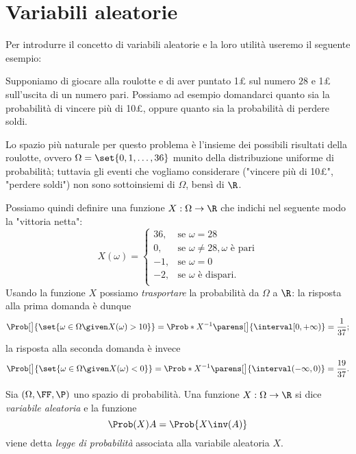 \section{Variabili aleatorie}

Per introdurre il concetto di variabili aleatorie e la loro utilità useremo il seguente esempio:
\begin{example}
    Supponiamo di giocare alla roulotte e di aver puntato 1£ sul numero $28$ e 1£ sull'uscita di un numero pari. Possiamo ad esempio domandarci quanto sia la probabilità di vincere più di 10£, oppure quanto sia la probabilità di perdere soldi.

    Lo spazio più naturale per questo problema è l'insieme dei possibili risultati della roulotte, ovvero $\Omega = \set{0, 1, \dots, 36}$ munito della distribuzione uniforme di probabilità; tuttavia gli eventi che vogliamo considerare ("vincere più di 10£", "perdere soldi") non sono sottoinsiemi di $\Omega$, bensì di $\R$.
    
    Possiamo quindi definire una funzione $X : \Omega \to \R$ che indichi nel seguente modo la "vittoria netta": \[
        X(\omega) = \begin{cases}
            36, &\text{se } \omega = 28\\
            0, &\text{se } \omega \neq 28, \omega \text{ è pari}\\
            -1, &\text{se } \omega = 0\\
            -2, &\text{se } \omega \text{ è dispari}.\\
        \end{cases}  
    \]
    Usando la funzione $X$ possiamo \emph{trasportare} la probabilità da $\Omega$ a $\R$: la risposta alla prima domanda è dunque \[
        \Prob[\big]{\set{\omega \in \Omega \given X(\omega) > 10}} 
        = \Prob*{X^{-1}\parens[\big]{\interval[{0, +\infty})}} 
        = \frac{1}{37};    
    \] la risposta alla seconda domanda è invece \[
        \Prob[\big]{\set{\omega \in \Omega \given X(\omega) < 0}} 
        = \Prob*{X^{-1}\parens[\big]{\interval({-\infty, 0})}} 
        = \frac{19}{37}.    
    \]
\end{example}

\begin{definition}
     Sia $(\Omega, \FF, \P)$ uno spazio di probabilità. Una funzione $X : \Omega \to \R$ si dice \emph{variabile aleatoria} e la funzione \[
        \Prob(X){A} = \Prob{X\inv(A)}  
    \] viene detta \emph{legge di probabilità} associata alla variabile aleatoria $X$.
\end{definition}

